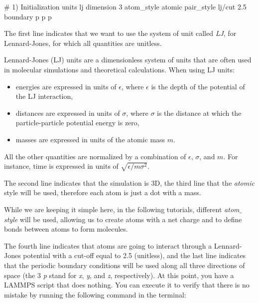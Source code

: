 \begin{lcverbatim}
# 1) Initialization
units lj
dimension 3
atom_style atomic
pair_style lj/cut 2.5
boundary p p p
\end{lcverbatim}

\noindent The first line indicates that we want to
use the system of unit called \textit{LJ}, for Lennard-Jones, for which all quantities
are unitless. 

\begin{tcolorbox}[colback=mylightblue!5!white,colframe=mylightblue!75!black,title=Background Information -- About LJ units]
Lennard-Jones (LJ) units are a dimensionless system of units that are often used in molecular simulations
and theoretical calculations. When using LJ units:
\begin{itemize}
\item energies are expressed in units of $\epsilon$, where $\epsilon$ is the
  depth of the potential of the LJ interaction,
\item distances are expressed in units of $\sigma$, where $\sigma$ is the distance
  at which the particle-particle potential energy is zero,
\item masses are expressed in units of the atomic mass $m$.
\end{itemize}
All the other quantities are normalized by a combination of $\epsilon$, $\sigma$,
and $m$. For instance, time is expressed in units of $\sqrt{ \epsilon / m \sigma^2}$. 
\end{tcolorbox}

\noindent The second line indicates that the simulation
is 3D, the third line that the \textit{atomic} style
will be used, therefore each atom is just a dot with a mass.

\begin{tcolorbox}[colback=mylightblue!5!white,colframe=mylightblue!75!black,title=About the atom style]
While we are keeping it simple here,
in the following tutorials, different \textit{atom$\_$style} will be used,
allowing us to create atoms with a net charge and to define 
bonds between atoms to form molecules.
\end{tcolorbox}

\noindent The fourth line indicates that atoms are going to interact
through a Lennard-Jones potential with a cut-off equal to
2.5 (unitless), and the last line indicates that the
periodic boundary conditions will be used along all three
directions of space (the 3 \textit{p} stand for \textit{x}, \textit{y}, and \textit{z},
respectively).
At this point, you have a LAMMPS script that does nothing.
You can execute it to verify that there is no mistake by
running the following command in the terminal:

